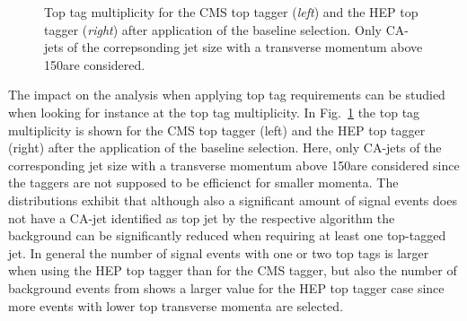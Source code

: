 \begin{figure}[!t]
  \centering
{}
  \caption{Top tag multiplicity for the CMS top tagger (\textit{left}) and the HEP top tagger (\textit{right}) after application of the baseline selection. Only CA-jets of the correpsonding jet size with a transverse momentum above 150\gev are considered.}
  \label{fig:stop_top_tag_multi}
\end{figure} 
The impact on the analysis when applying top tag requirements can be studied when looking for instance at the top tag multiplicity. In Fig.~\ref{fig:stop_top_tag_multi} the top tag multiplicity is shown for the CMS top tagger (left) and the HEP top tagger (right) after the application of the baseline selection. Here, only CA-jets of the corresponding jet size with a transverse momentum above 150\gev are considered since the taggers are not supposed to be efficienct for smaller momenta. The distributions exhibit that although also a significant amount of signal events does not have a CA-jet identified as top jet by the respective algorithm the background can be significantly reduced when requiring at least one top-tagged jet. In general the number of signal events with one or two top tags is larger when using the HEP top tagger than for the CMS tagger, but also the number of background events from \ttbar shows a larger value for the HEP top tagger case since more \ttbar events with lower top transverse momenta are selected. \\
